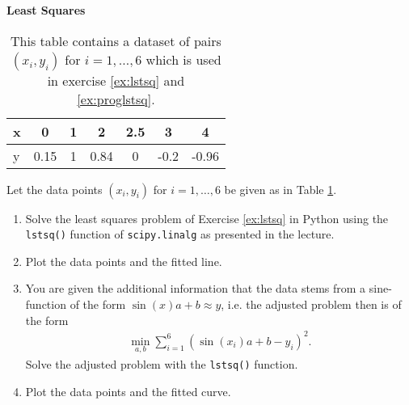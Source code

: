 \textbf{Least Squares}\\
\begin{table}[h]
	\centering
	\begin{tabular}{l|c c c c c c}
		x&0&1&2&2.5&3&4\\
		\hline
		y&0.15&1&0.84&0&-0.2&-0.96
	\end{tabular}
	\caption{This table contains a dataset of pairs $(x_i, y_i)$ for $i = 1,\dots,6$ which is used in exercise \ref{ex:lstsq} and \ref{ex:proglstsq}.}
	\label{tab:data}
\end{table}
\label{ex:proglstsq}
Let the data points $(x_i, y_i)$ for $i=1,\dots,6$ be given as in Table \ref{tab:data}.
\begin{enumerate}
	\item Solve the least squares problem of Exercise \ref{ex:lstsq} in Python using the \verb|lstsq()| function of 
	\verb|scipy.linalg| as presented in the lecture.
	\item Plot the data points and the fitted line.
	\item You are given the additional information that the data stems from a sine-function of the form $ \sin(x)a + b \approx y$, i.e. the adjusted problem then is of the form
	\begin{align*}
	\min \limits_{a,b} \sum_{i=1}^6 ( \sin(x_i)a + b - y_i)^2.
	\end{align*}
	Solve the adjusted problem with the \verb|lstsq()| function.
	\item Plot the data points and the fitted curve.
\end{enumerate}